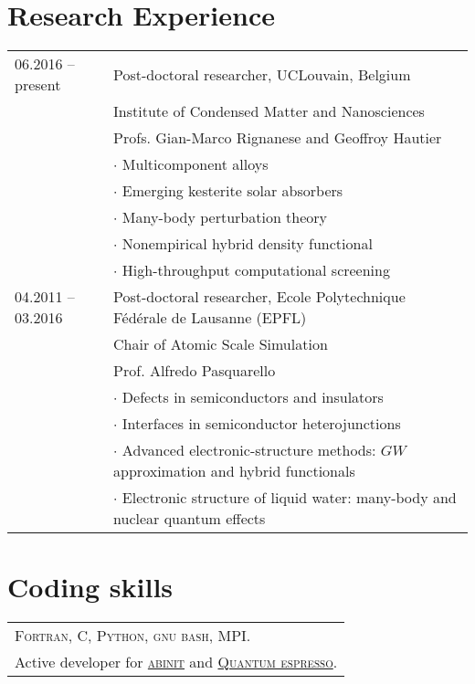 \documentclass[a4paper, 11pt, DIV=15,headings=normal]{scrartcl}
\begin{document}
\section*{Research Experience}
\begin{tabular}{ll}
06.2016 -- present & Post-doctoral researcher, UCLouvain, Belgium \\
                   & Institute of Condensed Matter and Nanosciences\\ 
                   & Profs. Gian-Marco Rignanese and Geoffroy Hautier  \\
                   & $\cdot$ Multicomponent alloys \\
                   & $\cdot$ Emerging kesterite solar absorbers \\
                   & $\cdot$ Many-body perturbation theory \\
                   & $\cdot$ Nonempirical hybrid density functional \\
                   & $\cdot$ High-throughput computational screening \\
                
04.2011 -- 03.2016 & Post-doctoral researcher, Ecole Polytechnique F\'{e}d\'{e}rale de Lausanne (EPFL) \\
                   & Chair of Atomic Scale Simulation  \\
                   & Prof. Alfredo Pasquarello \\
                   & $\cdot$ Defects in semiconductors and insulators \\
                   & $\cdot$ Interfaces in semiconductor heterojunctions  \\
                   & $\cdot$ Advanced electronic-structure methods: $GW$ approximation and hybrid functionals \\
                   & $\cdot$ Electronic structure of liquid water: many-body and nuclear quantum effects
\end{tabular}

\section*{Coding skills}
\begin{tabular}{l}
\textsc{Fortran}, \textsc{C}, \textsc{Python}, \textsc{gnu bash}, \textsc{MPI}. \\
Active developer for \href{http://www.abinit.org}{\textsc{abinit}} and 
\href{http://www.quantum-espresso.org}{\textsc{Quantum espresso}}. \\
\end{tabular}
\end{document}
